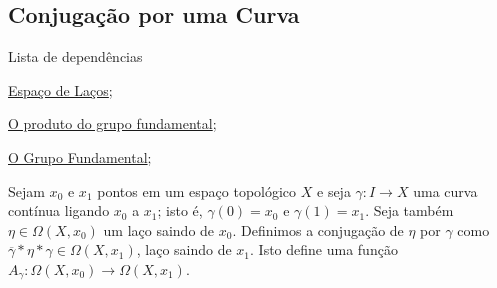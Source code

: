\subsection{Conjugação por uma Curva} %
\label{conjugacao-por-curva-prop}
\begin{titlemize}{Lista de dependências}
    \item \hyperref[espaco-lacos-def]{Espaço de Laços};\\
    \item \hyperref[produto-bem-definido-prop]{O produto do grupo fundamental};\\
	\item \hyperref[grupo-fundamental-def]{O Grupo Fundamental};
\end{titlemize}
\begin{defi} 
	Sejam $x_0$ e $x_1$ pontos em um espaço topológico $X$ e seja $\gamma: I \to X$ uma curva contínua ligando $x_0$ a $x_1$; isto é, $\gamma(0)=x_0$ e $\gamma(1) = x_1$. Seja também $\eta \in \Omega(X,x_0)$ um laço saindo de $x_0$. Definimos a conjugação de $\eta$ por $\gamma$ como $\overline{\gamma} * \eta * \gamma \in \Omega(X,x_1)$, laço saindo de $x_1$. Isto define uma função $A_{\gamma}: \Omega(X,x_0) \to \Omega(X,x_1)$.
\end{defi}

